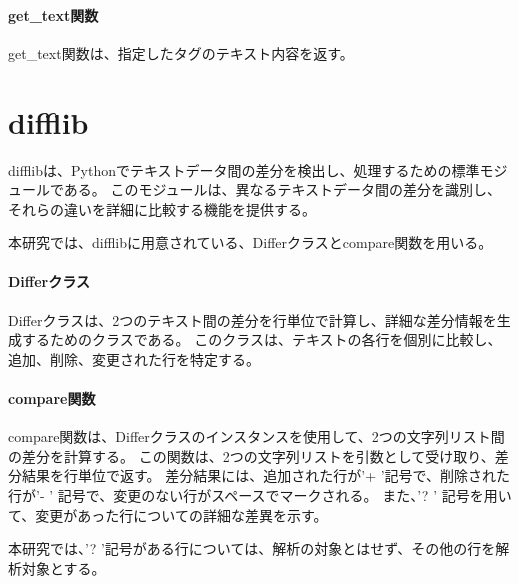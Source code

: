 \paragraph{get\_text関数}
get\_text関数は、指定したタグのテキスト内容を返す。

\section{difflib}\label{sec:difflib}
difflib\cite{difflib}は、Pythonでテキストデータ間の差分を検出し、処理するための標準モジュールである。
このモジュールは、異なるテキストデータ間の差分を識別し、それらの違いを詳細に比較する機能を提供する。
\par
本研究では、difflibに用意されている、Differクラスとcompare関数を用いる。
\paragraph{Differクラス}
Differクラスは、2つのテキスト間の差分を行単位で計算し、詳細な差分情報を生成するためのクラスである。
このクラスは、テキストの各行を個別に比較し、追加、削除、変更された行を特定する。
\paragraph{compare関数}
compare関数は、Differクラスのインスタンスを使用して、2つの文字列リスト間の差分を計算する。
この関数は、2つの文字列リストを引数として受け取り、差分結果を行単位で返す。
差分結果には、追加された行が'+ '記号で、削除された行が'- ' 記号で、変更のない行がスペースでマークされる。
また、'? ' 記号を用いて、変更があった行についての詳細な差異を示す。
\par
本研究では、'? '記号がある行については、解析の対象とはせず、その他の行を解析対象とする。

